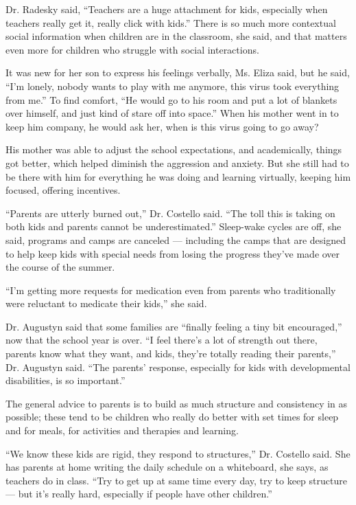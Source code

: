 Dr. Radesky said, ``Teachers are a huge attachment for kids, especially
when teachers really get it, really click with kids.'' There is so much
more contextual social information when children are in the classroom,
she said, and that matters even more for children who struggle with
social interactions.

It was new for her son to express his feelings verbally, Ms. Eliza said,
but he said, ``I'm lonely, nobody wants to play with me anymore, this
virus took everything from me.'' To find comfort, ``He would go to his
room and put a lot of blankets over himself, and just kind of stare off
into space.'' When his mother went in to keep him company, he would ask
her, when is this virus going to go away?

His mother was able to adjust the school expectations, and academically,
things got better, which helped diminish the aggression and anxiety. But
she still had to be there with him for everything he was doing and
learning virtually, keeping him focused, offering incentives.

``Parents are utterly burned out,'' Dr. Costello said. ``The toll this
is taking on both kids and parents cannot be underestimated.''
Sleep-wake cycles are off, she said, programs and camps are canceled ---
including the camps that are designed to help keep kids with special
needs from losing the progress they've made over the course of the
summer.

``I'm getting more requests for medication even from parents who
traditionally were reluctant to medicate their kids,'' she said.

Dr. Augustyn said that some families are ``finally feeling a tiny bit
encouraged,'' now that the school year is over. ``I feel there's a lot
of strength out there, parents know what they want, and kids, they're
totally reading their parents,'' Dr. Augustyn said. ``The parents'
response, especially for kids with developmental disabilities, is so
important.''

The general advice to parents is to build as much structure and
consistency in as possible; these tend to be children who really do
better with set times for sleep and for meals, for activities and
therapies and learning.

``We know these kids are rigid, they respond to structures,'' Dr.
Costello said. She has parents at home writing the daily schedule on a
whiteboard, she says, as teachers do in class. ``Try to get up at same
time every day, try to keep structure --- but it's really hard,
especially if people have other children.''

